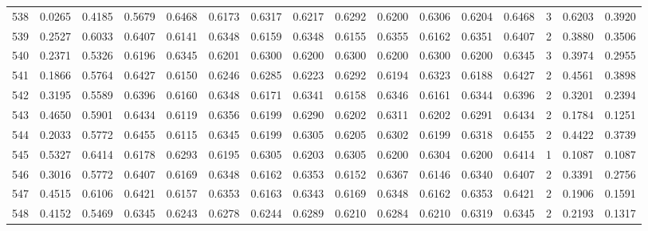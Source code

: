 \begin{tabular}{lrrrrrrrrrrrrrrr}
538 &      0.0265 &  0.4185 &  0.5679 &  0.6468 &  0.6173 &  0.6317 &  0.6217 &  0.6292 &  0.6200 &  0.6306 &   0.6204 &     0.6468 &      3 &                    0.6203 &                     0.3920 \\
539 &      0.2527 &  0.6033 &  0.6407 &  0.6141 &  0.6348 &  0.6159 &  0.6348 &  0.6155 &  0.6355 &  0.6162 &   0.6351 &     0.6407 &      2 &                    0.3880 &                     0.3506 \\
540 &      0.2371 &  0.5326 &  0.6196 &  0.6345 &  0.6201 &  0.6300 &  0.6200 &  0.6300 &  0.6200 &  0.6300 &   0.6200 &     0.6345 &      3 &                    0.3974 &                     0.2955 \\
541 &      0.1866 &  0.5764 &  0.6427 &  0.6150 &  0.6246 &  0.6285 &  0.6223 &  0.6292 &  0.6194 &  0.6323 &   0.6188 &     0.6427 &      2 &                    0.4561 &                     0.3898 \\
542 &      0.3195 &  0.5589 &  0.6396 &  0.6160 &  0.6348 &  0.6171 &  0.6341 &  0.6158 &  0.6346 &  0.6161 &   0.6344 &     0.6396 &      2 &                    0.3201 &                     0.2394 \\
543 &      0.4650 &  0.5901 &  0.6434 &  0.6119 &  0.6356 &  0.6199 &  0.6290 &  0.6202 &  0.6311 &  0.6202 &   0.6291 &     0.6434 &      2 &                    0.1784 &                     0.1251 \\
544 &      0.2033 &  0.5772 &  0.6455 &  0.6115 &  0.6345 &  0.6199 &  0.6305 &  0.6205 &  0.6302 &  0.6199 &   0.6318 &     0.6455 &      2 &                    0.4422 &                     0.3739 \\
545 &      0.5327 &  0.6414 &  0.6178 &  0.6293 &  0.6195 &  0.6305 &  0.6203 &  0.6305 &  0.6200 &  0.6304 &   0.6200 &     0.6414 &      1 &                    0.1087 &                     0.1087 \\
546 &      0.3016 &  0.5772 &  0.6407 &  0.6169 &  0.6348 &  0.6162 &  0.6353 &  0.6152 &  0.6367 &  0.6146 &   0.6340 &     0.6407 &      2 &                    0.3391 &                     0.2756 \\
547 &      0.4515 &  0.6106 &  0.6421 &  0.6157 &  0.6353 &  0.6163 &  0.6343 &  0.6169 &  0.6348 &  0.6162 &   0.6353 &     0.6421 &      2 &                    0.1906 &                     0.1591 \\
548 &      0.4152 &  0.5469 &  0.6345 &  0.6243 &  0.6278 &  0.6244 &  0.6289 &  0.6210 &  0.6284 &  0.6210 &   0.6319 &     0.6345 &      2 &                    0.2193 &                     0.1317 \\

\end{tabular}
